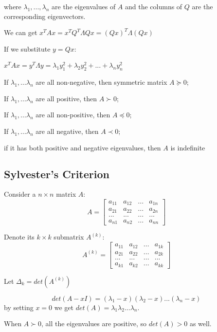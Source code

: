 \documentclass[11pt]{elegantbook}
\begin{document}
where $\lambda_1,..., \lambda_n$ are the eigenvalues of $A$ and the columns of $Q$ are the corresponding eigenvectors.

    We can get $x^TAx=x^TQ^T\Lambda Qx=(Qx)^T\Lambda(Qx)$
    
    If we substitute $y=Qx$:
    
    $x^TAx=y^T\Lambda y=\lambda_1y_1^2+\lambda_2y_2^2+...+\lambda_ny_n^2$

\begin{theorem}
    \quad

    If $\lambda_1,...\lambda_n$ are all non-negative, then symmetric matrix $A\succeq 0$;
    
    If $\lambda_1,...\lambda_n$ are all positive, then $A\succ 0$;
    
    If $\lambda_1,...\lambda_n$ are all non-positive, then $A\preceq 0$;
    
    If $\lambda_1,...\lambda_n$ are all negative, then $A\prec 0$;
    
    if it has both positive and negative eigenvalues, then $A$ is indefinite
\end{theorem}

\subsection{Sylvester’s Criterion}

Consider a $n\times n$ matrix $A$: $$A=\begin{bmatrix}
    a_{11}&a_{12}&... &a_{1n}\\a_{21}&a_{22}&...&a_{2n}\\...&...&...&...\\a_{n1}&a_{n2}&...&a_{nn}
\end{bmatrix}$$

Denote its $k\times k$ submatrix $A^{(k)}$:
$$A^{(k)}=\begin{bmatrix}
    a_{11}&a_{12}&... &a_{1k}\\a_{21}&a_{22}&...&a_{2k}\\...&...&...&...\\a_{k1}&a_{k2}&...&a_{kk}
\end{bmatrix}$$

Let $\Delta_k=det(A^{(k)})$

$$det(A-xI)=(\lambda_1-x)(\lambda_2-x)...(\lambda_n-x)$$
by setting $x = 0$ we get $det(A) = \lambda_1\lambda_2...\lambda_n$.

When $A\succ 0$, all the eigenvalues are positive, so $det(A) > 0$ as well.
\end{document}
